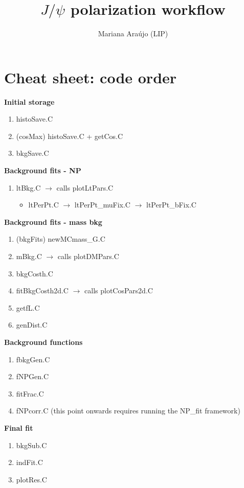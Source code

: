 \documentclass{article}
\begin{document}
\title{$J/\psi$ polarization workflow }
\author{Mariana Ara\'ujo (LIP)}
\maketitle

\tableofcontents

\pagebreak

\section{Cheat sheet: code order}


\textbf{Initial storage}
\begin{enumerate}
\item histoSave.C
\item (cosMax) histoSave.C + getCos.C
\item bkgSave.C
\end{enumerate}

\textbf{Background fits - NP}
\begin{enumerate}
\item ltBkg.C $\rightarrow$ calls plotLtPars.C
\begin{itemize}
\item ltPerPt.C $\rightarrow$ ltPerPt\_muFix.C $\rightarrow$ ltPerPt\_bFix.C
\end{itemize}
\end{enumerate}

\textbf{Background fits - mass bkg}
\begin{enumerate}
\item (bkgFits) newMCmass\_G.C
\item mBkg.C $\rightarrow$ calls plotDMPars.C
\item bkgCosth.C
\item fitBkgCosth2d.C $\rightarrow$ calls plotCosPars2d.C
\item getfL.C
\item genDist.C
\end{enumerate}

\textbf{Background functions}
\begin{enumerate}
\item fbkgGen.C
\item fNPGen.C
\item fitFrac.C
\item fNPcorr.C (this point onwards requires running the NP\_fit framework)
\end{enumerate}

\textbf{Final fit}
\begin{enumerate}
\item bkgSub.C
\item indFit.C
\item plotRes.C
\end{enumerate}
\end{document}
